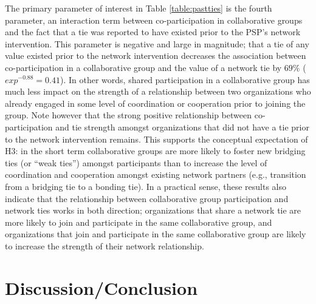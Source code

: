 \documentclass[12pt,a4paper,titlepage]{article}
\begin{document}
The primary parameter of interest in Table \ref{table:pastties} is the fourth parameter, an interaction term between co-participation in collaborative groups and the fact that a tie was reported to have existed prior to the PSP's network intervention. This parameter is negative and large in magnitude; that a tie of any value existed prior to the network intervention decreases the association between co-participation in a collaborative group and the value of a network tie by $69\%$ ($exp^{-0.88} = 0.41$). In other words, shared participation in a collaborative group has much less impact on the strength of a relationship between two organizations who already engaged in some level of coordination or cooperation prior to joining the group. Note however that the strong positive relationship between co-participation and tie strength amongst organizations that did not have a tie prior to the network intervention remains. This supports the conceptual expectation of H3: in the short term collaborative groups are more likely to foster new bridging ties (or ``weak ties'') amongst participants than to increase the level of coordination and cooperation amongst existing network partners (e.g., transition from a bridging tie to a bonding tie). In a practical sense, these results also indicate that the relationship between collaborative group participation and network ties works in both direction; organizations that share a network tie are more likely to join and participate in the same collaborative group, and organizations that join and participate in the same collaborative group are likely to increase the strength of their network relationship. 


\section{Discussion/Conclusion}
\end{document}
